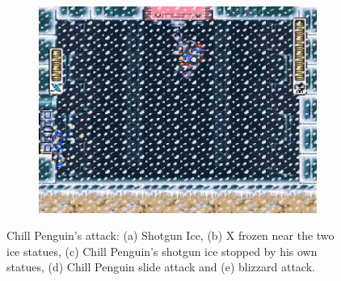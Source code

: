 \begin{figure}[h]
\begin{subfigure}{0.49\textwidth}
		\caption{}
	\end{subfigure}\\
	\begin{subfigure}{0.4\textwidth}
		\centering
		\includegraphics[width=\linewidth]{figures/X1/Chill_blizzard.jpg}
		\caption{}
		
	\end{subfigure}
	\caption{Chill Penguin's attack: (a) Shotgun Ice, (b) X frozen near the two ice statues, (c) Chill Penguin's shotgun ice stopped by his own statues, (d) Chill Penguin slide attack and (e) blizzard attack.}
	
\end{figure}
